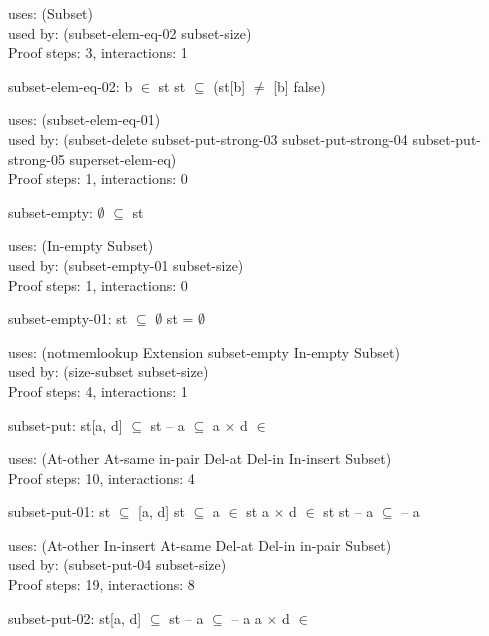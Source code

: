 \documentclass[a4paper]{article}
\begin{document}
uses: (Subset)\\
used by: (subset-elem-eq-02 subset-size)\\
Proof steps: 3, interactions: 1

\medskip

subset-elem-eq-02: 
 \Fol b $\in$ st \And st $\subseteq$  \Imp (st[b] $\neq$ [b] \Equiv false)


uses: (subset-elem-eq-01)\\
used by: (subset-delete subset-put-strong-03 subset-put-strong-04
          subset-put-strong-05 superset-elem-eq)\\
Proof steps: 1, interactions: 0

\medskip

subset-empty: 
 \Fol $\emptyset$ $\subseteq$ st


uses: (In-empty Subset)\\
used by: (subset-empty-01 subset-size)\\
Proof steps: 1, interactions: 0

\medskip

subset-empty-01: 
 \Fol st $\subseteq$ $\emptyset$ \Equiv st = $\emptyset$


uses: (notmemlookup Extension subset-empty In-empty Subset)\\
used by: (size-subset subset-size)\\
Proof steps: 4, interactions: 1

\medskip

subset-put: 
 \Fol st[a, d] $\subseteq$  \Equiv st -- a $\subseteq$  \And a $\times$ d $\in$ 


uses: (At-other At-same in-pair Del-at Del-in In-insert Subset)\\
Proof steps: 10, interactions: 4

\medskip

subset-put-01: 
 \Fol st $\subseteq$ [a, d] \Equiv st $\subseteq$  \And \Not a $\in$ st \Or a $\times$ d $\in$ st \And st -- a $\subseteq$  -- a


uses: (At-other In-insert At-same Del-at Del-in in-pair Subset)\\
used by: (subset-put-04 subset-size)\\
Proof steps: 19, interactions: 8

\medskip

subset-put-02: 
 \Fol st[a, d] $\subseteq$  \Equiv st -- a $\subseteq$  -- a \And a $\times$ d $\in$ 
\end{document}
